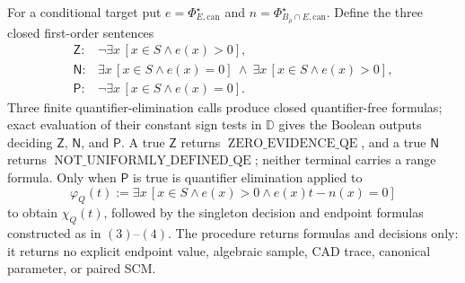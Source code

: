 For a conditional target put \(e=\Phi_{E,\mathrm{can}}^\star\) and \(n=\Phi_{B_\rho\cap E,\mathrm{can}}^\star\).  Define the three closed first-order sentences
\[
\begin{array}{ll}
\mathsf Z:&\neg\exists x\,[x\in S\wedge e(x)>0],\\
\mathsf N:&\exists x\,[x\in S\wedge e(x)=0]
\ \wedge\ \exists x\,[x\in S\wedge e(x)>0],\\
\mathsf P:&\neg\exists x\,[x\in S\wedge e(x)=0].
\end{array}
\tag{5}
\]
Three finite quantifier-elimination calls produce closed quantifier-free formulas; exact evaluation of their constant sign tests in \(\mathbb D\) gives the Boolean outputs deciding \(\mathsf Z\), \(\mathsf N\), and \(\mathsf P\).  A true \(\mathsf Z\) returns \(\operatorname{ZERO\_EVIDENCE\_QE}\), and a true \(\mathsf N\) returns \(\operatorname{NOT\_UNIFORMLY\_DEFINED\_QE}\); neither terminal carries a range formula.  Only when \(\mathsf P\) is true is quantifier elimination applied to
\[
\varphi_Q(t):=
\exists x\,[x\in S\wedge e(x)>0\wedge e(x)t-n(x)=0]
\tag{6}
\]
to obtain \(\chi_Q(t)\), followed by the singleton decision and endpoint formulas constructed as in \((3)\)--\((4)\).  The procedure returns formulas and decisions only: it returns no explicit endpoint value, algebraic sample, CAD trace, canonical parameter, or paired SCM.
